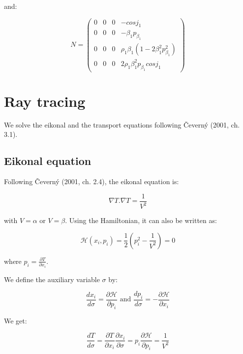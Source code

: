 \documentclass[main.tex]{subfiles}
\begin{document}
and:

\begin{equation}
N = \begin{pmatrix}
0 & 0 & 0 & - cos j_1 \\
0 & 0 & 0 & - \beta_1 p_{\beta_1} \\
0 & 0 & 0 & \rho_1 \beta_1 (1 - 2 \beta_1^2 p_{\beta_1}^2) \\
0 & 0 & 0 & 2 \rho_1 \beta_1^2 p_{\beta_1} cos j_1
\end{pmatrix}
\end{equation}

\chapter{Ray tracing}

We solve the eikonal and the transport equations following \v Cevern\'y (2001, ch. 3.1).

\section{Eikonal equation}

Following \v Cevern\'y (2001, ch. 2.4), the eikonal equation is:

\begin{equation}
\nabla T . \nabla T = \frac{1}{V^2}
\end{equation}

with $V = \alpha$ or $V= \beta$. Using the Hamiltonian, it can also be written as:

\begin{equation}
\mathcal H (x_i, p_i) = \frac{1}{2} (p_i^2 - \frac{1}{V^2}) = 0
\end{equation}

where $p_i = \frac{\partial T}{\partial x_i}$.

We define the auxiliary variable $\sigma$ by:

\begin{equation}
\frac{dx_i}{d\sigma} = \frac{\partial \mathcal H}{\partial p_i} \text{ and } \frac{dp_i}{d\sigma} = - \frac{\partial \mathcal H}{\partial x_i}
\end{equation}

We get:

\begin{equation}
\frac{dT}{d\sigma} = \frac{\partial T}{\partial x_i} \frac{\partial x_i}{\partial \sigma} = p_i \frac{\partial \mathcal H}{\partial p_i} = \frac{1}{V^2}
\end{equation}
\end{document}
